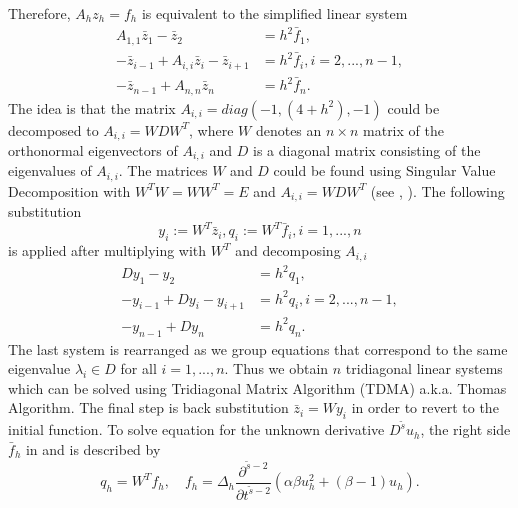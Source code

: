 \documentclass[11pt,a4paper,twoside]{article}
\begin{document}
Therefore, $A_h z_h = f_h$ is equivalent to the simplified linear system
\begin{align}
A_{1,1}\bar z_1 - \bar z_2 &= h^2\bar f_1, \nonumber \\
- \bar z_{i-1}  + A_{i,i}\bar z_i - \bar z_{i+1}  &= h^2\bar f_i, i = 2,...,n-1, \nonumber \\
- \bar z_{n-1} + A_{n,n}\bar z_n &= h^2\bar f_n.\label{LinSys}
\end{align}
The idea is that the matrix $A_{i,i} = diag(-1, (4+h^2), -1)$ could be decomposed to $A_{i,i}  = W D W^T$, where $W$ denotes an $n \times n$ matrix of the orthonormal eigenvectors of $A_{i,i} $ and $ D$ is a diagonal matrix consisting of the eigenvalues of $A_{i,i}$. The matrices $W$ and $D$ could be found using Singular Value Decomposition with $W^T W = W W^T = E$ and $A_{i,i} = WDW^T$ (see \cite{Tref}, \cite{FPS}). The following substitution 
\begin{equation}\label{subst}
y_i := W^T \bar z_i, q_i := W^T \bar f_i, i = 1, ...,n
\end{equation}
is applied after multiplying  with $W^T$ and decomposing $A_{i,i}$
\begin{align}
Dy_1 - y_2 &= h^2 q_1,\nonumber \\
-y_{i-1} + D y_i - y_{i+1} &= h^2 q_i, i = 2,...,n-1,\nonumber \\
- y_{n-1} + Dy_n &= h^2 q_n.\label{SubSys}
\end{align}
The last system  is rearranged as we group equations that correspond to the same eigenvalue $\lambda_i \in D$ for all $i = 1,...,n$. Thus we obtain $n$ tridiagonal linear systems which can be solved using Tridiagonal Matrix Algorithm (TDMA) a.k.a. Thomas Algorithm. The final step is back substitution $\bar z_i = W y_i$ in order to revert to the initial function. To solve equation  for the unknown derivative $D^{\tilde s}u_h$, the right side $\bar f_h$  in  and  is described by
$$
q_h = W^T f_h, \quad f_h = \Delta_h \frac{ \partial^{ \tilde s - 2 } } { \partial t^{ \tilde s - 2 } } ( \alpha \beta u_h^2  + (\beta -1)u_h).
$$

\end{document}
